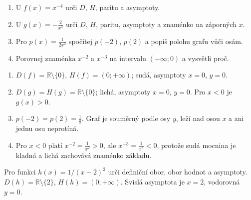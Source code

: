 \documentclass[11pt,a4paper]{article}
\begin{document}
\begin{zadaniReseniBox}[title={Samostatná práce 2}]
\begin{enumerate}[label=\alph*)]
\item U $f(x)=x^{-4}$ urči $D$, $H$, paritu a asymptoty.
\item U $g(x)=-\frac{2}{x^3}$ urči $D$, $H$, paritu, asymptoty a znaménko na záporných $x$.
\item Pro $p(x)=\frac{1}{2x^2}$ spočítej $p(-2)$, $p(2)$ a popiš polohu grafu vůči osám.
\item Porovnej znaménka $x^{-2}$ a $x^{-3}$ na intervalu $(-\infty;0)$ a vysvětli proč.
\end{enumerate}
\tcblower
\begin{enumerate}[label=\alph*)]
\item $D(f)=\mathbb R\setminus\{0\}$, $H(f)=(0;+\infty)$; sudá, asymptoty $x=0$, $y=0$.
\item $D(g)=H(g)=\mathbb R\setminus\{0\}$; lichá, asymptoty $x=0$, $y=0$. Pro $x<0$ je $g(x)>0$.
\item $p(-2)=p(2)=\frac{1}{8}$. Graf je souměrný podle osy $y$, leží nad osou $x$ a ani jednu osu neprotíná.
\item Pro $x<0$ platí $x^{-2}=\frac{1}{x^2}>0$, ale $x^{-3}=\frac{1}{x^3}<0$, protože sudá mocnina je kladná a lichá zachovává znaménko základu.
\end{enumerate}
\end{zadaniReseniBox}

\begin{zadaniReseniBox}[title={Rozšíření 1}]
Pro funkci $h(x)=1/(x-2)^2$ urči definiční obor, obor hodnot a asymptoty.
\tcblower
$D(h)=\mathbb R\setminus\{2\}$, $H(h)=(0;+\infty)$. Svislá asymptota je $x=2$, vodorovná $y=0$.
\end{zadaniReseniBox}
\end{document}
